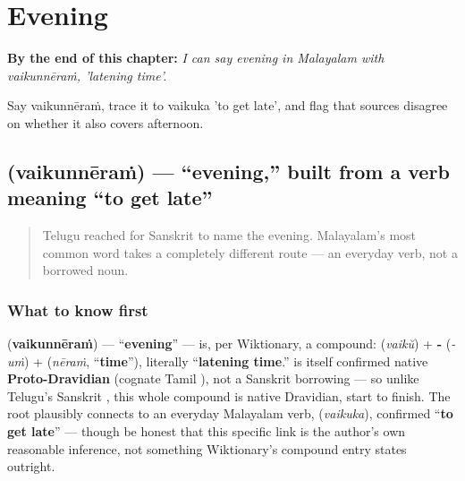 
\chapter{Evening}
\label{ch:ml-evening}

\begin{chapteropening}
\textbf{By the end of this chapter:} \emph{I can say evening in Malayalam with vaikunnēraṁ, 'latening time'.}

Say vaikunnēraṁ, trace it to vaikuka 'to get late', and flag that sources disagree on whether it also covers afternoon.
\end{chapteropening}

\section[\texorpdfstring{\ml{വൈകുന്നേരം} (vaikunnēraṁ)}{വൈകുന്നേരം (vaikunnēraṁ)}]{ (vaikunnēraṁ) — \textquotedblleft{}evening,\textquotedblright{} built from a verb meaning \textquotedblleft{}to get late\textquotedblright{}}

\label{lesson:ML-C27-vaikunneram}



\begin{quote}
Telugu reached for Sanskrit to name the evening. Malayalam's most common word takes a completely different route — an everyday verb, not a borrowed noun.
\end{quote}

\subsection*{What to know first}
\textbf{} (\textbf{vaikunnēraṁ}) — \textquotedblleft{}\textbf{evening}\textquotedblright{} — is, per Wiktionary, a compound: \textbf{} (\emph{vaikŭ}) + \textbf{-} (\emph{-uṁ}) + \textbf{} (\emph{nēraṁ}, \textquotedblleft{}\textbf{time}\textquotedblright{}), literally \textquotedblleft{}\textbf{latening time}.\textquotedblright{} \textbf{} is itself confirmed native \textbf{Proto-Dravidian} (cognate Tamil ), not a Sanskrit borrowing — so unlike Telugu's Sanskrit \textbf{}, this whole compound is native Dravidian, start to finish. The \textbf{} root plausibly connects to an everyday Malayalam verb, \textbf{} (\emph{vaikuka}), confirmed \textquotedblleft{}\textbf{to get late}\textquotedblright{} — though be honest that this specific link is the author's own reasonable inference, not something Wiktionary's compound entry states outright.

